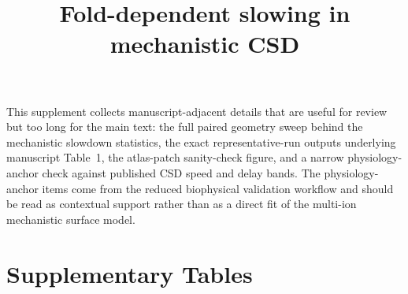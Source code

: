 \documentclass[12pt]{article}
\title{Fold-dependent slowing in mechanistic CSD}
\author{}
\date{}
\begin{document}
\maketitle

\renewcommand{\thetable}{S\arabic{table}}
\renewcommand{\thefigure}{S\arabic{figure}}

This supplement collects manuscript-adjacent details that are useful for review but too long for the main text: the full paired geometry sweep behind the mechanistic slowdown statistics, the exact representative-run outputs underlying manuscript Table~1, the atlas-patch sanity-check figure, and a narrow physiology-anchor check against published CSD speed and delay bands. The physiology-anchor items come from the reduced biophysical validation workflow and should be read as contextual support rather than as a direct fit of the multi-ion mechanistic surface model.

\section*{Supplementary Tables}
\end{document}
